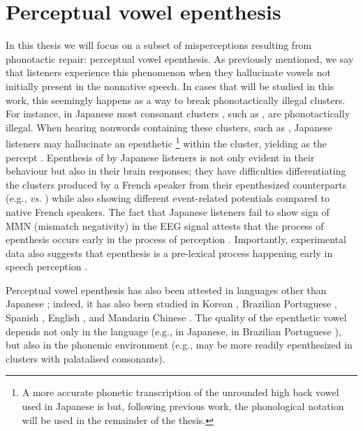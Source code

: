 \section{Perceptual vowel epenthesis}
In this thesis we will focus on a subset of misperceptions resulting from phonotactic repair: perceptual vowel epenthesis. As previously mentioned, we say that listeners experience this phenomenon when they hallucinate vowels not initially present in the nonnative speech. In cases that will be studied in this work, this seemingly happens as a way to break phonotactically illegal clusters. For instance, in Japanese most consonant clusters%
, such as , are phonotactically illegal. When hearing nonwords containing these clusters, such as , Japanese listeners may hallucinate an epenthetic \footnote{A more accurate phonetic transcription of the unrounded high back vowel used in Japanese is \textipa{[W]} but, following previous work, the phonological notation  will be used in the remainder of the thesis.} within the cluster, yielding  as the percept \cite{dupoux1999}. Epenthesis of  by Japanese listeners is not only evident in their behaviour but also in their brain responses; they have difficulties differentiating the clusters produced by a French speaker from their epenthesized counterparts (e.g.,  \textit{vs.} ) while also showing different event-related potentials compared to native French speakers. The fact that Japanese listeners fail to show sign of MMN (mismatch negativity) in the EEG signal attests that the process of epenthesis occurs early in the process of perception \cite{dehaene2000}. Importantly, experimental data also suggests that epenthesis is a pre-lexical process happening early in speech perception \cite{dupoux2001}.

Perceptual vowel epenthesis has also been attested in languages other than Japanese \cite{dupoux1999, dehaene2000, dupoux2001, monahan2009, dupoux2011, mattingley2015}; indeed, it has also been studied in Korean \cite{kabak2007, shin2011, dejong2012, durvasula2015, durvasula2016}, Brazilian Portuguese \cite{dupoux2011}, Spanish \cite{halle2014}, English \cite{berent2007, zhao2018}, and Mandarin Chinese \cite{durvasula2018}. The quality of the epenthetic vowel depends not only in the language (e.g., \textipa{[W]} in Japanese, \textipa{[i]} in Brazilian Portuguese \cite{dupoux2011}), but also in the phonemic environment (e.g.,  may be more readily epenthesized in clusters with palatalised consonants). 

